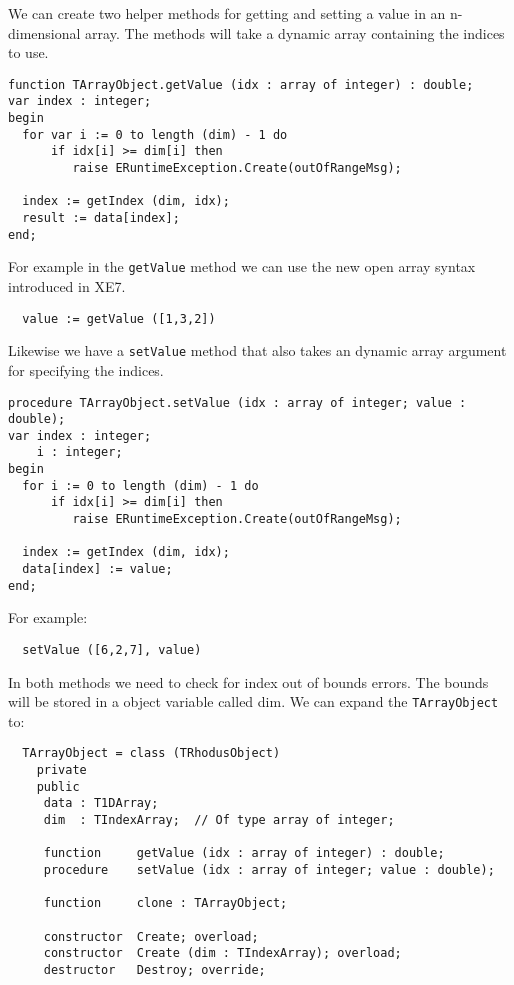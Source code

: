 We can create two helper methods for getting and setting a value in an n-dimensional array. The methods will take a dynamic array containing the indices to use.

\begin{lstlisting}
function TArrayObject.getValue (idx : array of integer) : double;
var index : integer;
begin
  for var i := 0 to length (dim) - 1 do
      if idx[i] >= dim[i] then
         raise ERuntimeException.Create(outOfRangeMsg);

  index := getIndex (dim, idx);
  result := data[index];
end;
\end{lstlisting}

For example in the {\tt getValue} method we can use the new open array syntax introduced in XE7.

\begin{lstlisting}
  value := getValue ([1,3,2])
\end{lstlisting}

Likewise we have a {\tt setValue} method that also takes an dynamic array argument for specifying the indices.

\begin{lstlisting}
procedure TArrayObject.setValue (idx : array of integer; value : double);
var index : integer;
    i : integer;
begin
  for i := 0 to length (dim) - 1 do
      if idx[i] >= dim[i] then
         raise ERuntimeException.Create(outOfRangeMsg);

  index := getIndex (dim, idx);
  data[index] := value;
end;
\end{lstlisting}

For example:

\begin{lstlisting}
  setValue ([6,2,7], value)
\end{lstlisting}

In both methods we need to check for index out of bounds errors. The bounds will be stored in a object variable called dim. We can expand the {\tt TArrayObject} to:

\begin{lstlisting}
  TArrayObject = class (TRhodusObject)
    private
    public
     data : T1DArray;
     dim  : TIndexArray;  // Of type array of integer;

     function     getValue (idx : array of integer) : double;
     procedure    setValue (idx : array of integer; value : double);

     function     clone : TArrayObject;

     constructor  Create; overload;
     constructor  Create (dim : TIndexArray); overload;
     destructor   Destroy; override;
\end{lstlisting}

